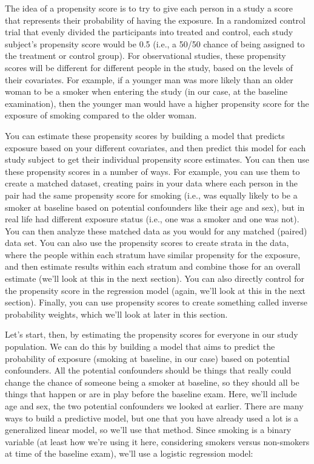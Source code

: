 \documentclass[
]{book}
\begin{document}
The idea of a propensity score is to try to give each person in a study a score that represents their probability of having the exposure. In a randomized control trial that evenly divided the participants into treated and control, each study subject's propensity score would be 0.5 (i.e., a 50/50 chance of being assigned to the treatment or control group). For observational studies, these propensity scores will be different for different people in the study, based on the levels of their covariates. For example, if a younger man was more likely than an older woman to be a smoker when entering the study (in our case, at the baseline examination), then the younger man would have a higher propensity score for the exposure of smoking compared to the older woman.

You can estimate these propensity scores by building a model that predicts exposure based on your different covariates, and then predict this model for each study subject to get their individual propensity score estimates. You can then use these propensity scores in a number of ways. For example, you can use them to create a matched dataset, creating pairs in your data where each person in the pair had the same propensity score for smoking (i.e., was equally likely to be a smoker at baseline based on potential confounders like their age and sex), but in real life had different exposure status (i.e., one was a smoker and one was not). You can then analyze these matched data as you would for any matched (paired) data set. You can also use the propensity scores to create strata in the data, where the people within each stratum have similar propensity for the exposure, and then estimate results within each stratum and combine those for an overall estimate (we'll look at this in the next section). You can also directly control for the propensity score in the regression model (again, we'll look at this in the next section). Finally, you can use propensity scores to create something called inverse probability weights, which we'll look at later in this section.

Let's start, then, by estimating the propensity scores for everyone in our study population. We can do this by building a model that aims to predict the probability of exposure (smoking at baseline, in our case) based on potential confounders. All the potential confounders should be things that really could change the chance of someone being a smoker at baseline, so they should all be things that happen or are in play before the baseline exam. Here, we'll include age and sex, the two potential confounders we looked at earlier. There are many ways to build a predictive model, but one that you have already used a lot is a generalized linear model, so we'll use that method. Since smoking is a binary variable (at least how we're using it here, considering smokers versus non-smokers at time of the baseline exam), we'll use a logistic regression model:
\end{document}
